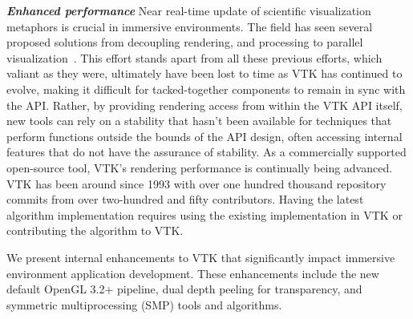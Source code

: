 
\textit{\textbf{Enhanced performance}} Near real-time update of scientific visualization metaphors is crucial in immersive environments.
The field has seen several proposed solutions from decoupling rendering, and processing to parallel visualization~\cite{Bryson:1996, van2000vista}.
This effort stands apart from all these previous efforts, which valiant
as they were, ultimately have been lost to time as VTK has continued to
evolve, making it difficult for tacked-together components to remain in
sync with the API.
Rather, by providing rendering access from within the VTK API itself, new
tools can rely on a stability that hasn't been available for techniques
that perform functions outside the bounds of the API design, often accessing
internal features that do not have the assurance of stability.
As a commercially supported open-source tool, VTK's rendering performance is
continually being advanced.
VTK has been around since 1993 with over one hundred thousand repository commits from over two-hundred and fifty contributors.
Having the latest algorithm implementation requires using the existing implementation in VTK or contributing the algorithm to VTK.

We present internal enhancements to VTK that significantly impact immersive
environment application development.
These enhancements include the new default OpenGL 3.2+ pipeline,
dual depth peeling for transparency, and symmetric multiprocessing (SMP)
tools and algorithms.


